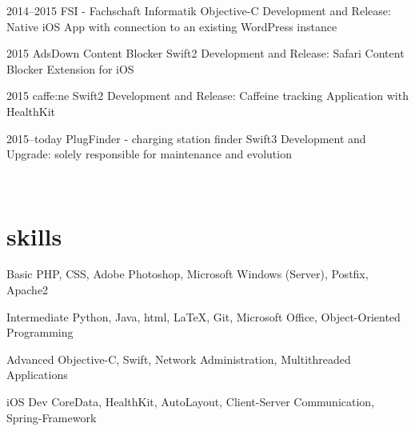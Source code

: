 \documentclass[]{friggeri-cv} %
\begin{document}
\begin{entrylist}


\entry
{2014--2015}
{FSI - Fachschaft Informatik}
{Objective-C}
{Development and Release: Native iOS App with connection to an existing WordPress instance}


\entry
{2015}
{AdsDown Content Blocker}
{Swift2}
{Development and Release: Safari Content Blocker Extension for iOS}


\entry
{2015}
{caffe:ne}
{Swift2}
{Development and Release: Caffeine tracking Application with HealthKit}


\entry
{2015--today}
{PlugFinder - charging station finder}
{Swift3}
{Development and Upgrade: solely responsible for maintenance and evolution}

\\
\end{entrylist}


\section{skills}

\begin{entrylist}


\entry
{Basic}
{PHP, CSS, Adobe Photoshop, Microsoft Windows (Server), Postfix, Apache2}
{}

\entry
{Intermediate}
{Python, Java, html, LaTeX, Git, Microsoft Office, Object-Oriented Programming}
{}

\entry
{Advanced}
{Objective-C, Swift, Network Administration, Multithreaded Applications}
{}

\entry
{iOS Dev}
{CoreData, HealthKit, AutoLayout, Client-Server Communication, Spring-Framework}
{}
\\
\end{entrylist}
\end{document}
